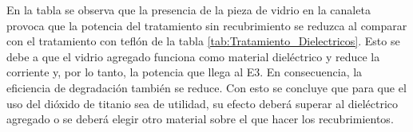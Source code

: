En la tabla se observa que la presencia de la pieza de vidrio en la canaleta provoca que la potencia del tratamiento sin recubrimiento se reduzca al comparar con el tratamiento con teflón de la tabla \ref{tab:Tratamiento_Dielectricos}. Esto se debe a que el vidrio agregado funciona como material dieléctrico y reduce la corriente y, por lo tanto, la potencia que llega al E3. En consecuencia, la eficiencia de degradación también se reduce. Con esto se concluye que para que el uso del dióxido de titanio sea de utilidad, su efecto deberá superar al dieléctrico agregado o se deberá elegir otro material sobre el que hacer los recubrimientos.